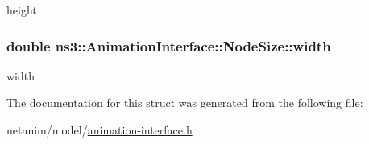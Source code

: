 height 

\subsubsection[{\texorpdfstring{width}{width}}]{\setlength{\rightskip}{0pt plus 5cm}double ns3\+::\+Animation\+Interface\+::\+Node\+Size\+::width}\hypertarget{structns3_1_1AnimationInterface_1_1NodeSize_a03c08b24f4fc9fb297e8e12a30cc9b64}{}\label{structns3_1_1AnimationInterface_1_1NodeSize_a03c08b24f4fc9fb297e8e12a30cc9b64}


width 



The documentation for this struct was generated from the following file\+:\begin{DoxyCompactItemize}
\item 
netanim/model/\hyperlink{animation-interface_8h}{animation-\/interface.\+h}\end{DoxyCompactItemize}
